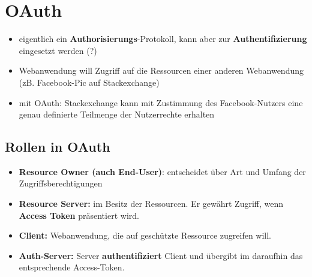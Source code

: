 \section{OAuth}
\begin{itemize}
	\item eigentlich ein \textbf{Authorisierungs}-Protokoll, kann aber zur \textbf{Authentifizierung} eingesetzt werden (?)
	\item Webanwendung will Zugriff auf die Ressourcen einer anderen Webanwendung (zB. Facebook-Pic auf Stackexchange)
	\item mit OAuth: Stackexchange kann mit Zustimmung des Facebook-Nutzers eine genau definierte Teilmenge der Nutzerrechte erhalten
\end{itemize}

\subsection{Rollen in OAuth}
\begin{itemize}
	\item \textbf{Resource Owner (auch End-User)}: entscheidet über Art und Umfang der Zugriffsberechtigungen
	\item \textbf{Resource Server:} im Besitz der Ressourcen. Er gewährt Zugriff, wenn \textbf{Access Token} präsentiert wird.
	\item \textbf{Client:} Webanwendung, die auf geschützte Ressource zugreifen will.
	\item \textbf{Auth-Server:} Server \textbf{authentifiziert} Client und übergibt im daraufhin das entsprechende Access-Token.
\end{itemize}

